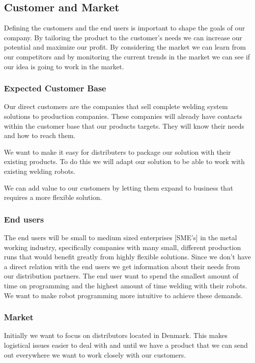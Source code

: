 \subsection{Customer and Market}

Defining the customers and the end users is important to shape the goals of our company. 
By tailoring the product to the customer's needs we can increase our potential and maximize our profit. 
By considering the market we can learn from our competitors and by monitoring the current trends in the market we can see if our idea is going to work in the market. 

\subsubsection{Expected Customer Base}
Our direct customers are the companies that sell complete welding system solutions to production companies. 
These companies will already have contacts within the customer base that our products targets.
They will know their needs and how to reach them. 

We want to make it easy for distributers to package our solution with their existing products.
To do this we will adapt our solution to be able to work with existing welding robots.

We can add value to our customers by letting them expand to business that requires a more flexible solution.

\subsubsection{End users}
The end users will be small to medium sized enterprises [SME's] in the metal working industry, specifically companies with many small, different production runs that would benefit greatly from highly flexible solutions.
Since we don't have a direct relation with the end users we get information about their needs from our distribution partners.
The end user want to spend the smallest amount of time on programming and the highest amount of time welding with their robots.
We want to make robot programming more intuitive to achieve these demands.

\subsubsection{Market}
Initially we want to focus on distributors located in Denmark.
This makes logistical issues easier to deal with and until we have a product that we can send out everywhere we want to work closely with our customers.

